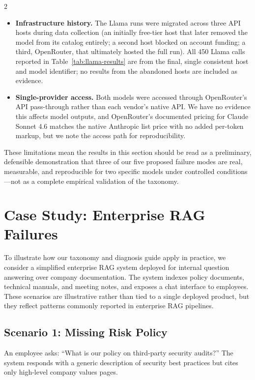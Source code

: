 \documentclass[11pt,a4paper]{article}
\begin{document}
\begin{multicols}{2}
\begin{itemize}[leftmargin=*,nosep]
\item \textbf{Infrastructure history.} The Llama runs were migrated across three API hosts during data collection (an initially free-tier host that later removed the model from its catalog entirely; a second host blocked on account funding; a third, OpenRouter, that ultimately hosted the full run). All 450 Llama calls reported in Table~\ref{tab:llama-results} are from the final, single consistent host and model identifier; no results from the abandoned hosts are included as evidence.
\item \textbf{Single-provider access.} Both models were accessed through OpenRouter's API pass-through rather than each vendor's native API. We have no evidence this affects model outputs, and OpenRouter's documented pricing for Claude Sonnet 4.6 matches the native Anthropic list price with no added per-token markup, but we note the access path for reproducibility.
\end{itemize}

These limitations mean the results in this section should be read as a preliminary, defensible demonstration that three of our five proposed failure modes are real, measurable, and reproducible for two specific models under controlled conditions---not as a complete empirical validation of the taxonomy.

\section{Case Study: Enterprise RAG Failures}
\label{sec:casestudy}

To illustrate how our taxonomy and diagnosis guide apply in practice, we consider a simplified enterprise RAG system deployed for internal question answering over company documentation. The system indexes policy documents, technical manuals, and meeting notes, and exposes a chat interface to employees. These scenarios are illustrative rather than tied to a single deployed product, but they reflect patterns commonly reported in enterprise RAG pipelines.

\subsection{Scenario 1: Missing Risk Policy}

An employee asks: ``What is our policy on third-party security audits?'' The system responds with a generic description of security best practices but cites only high-level company values pages.


\end{multicols}
\end{document}
